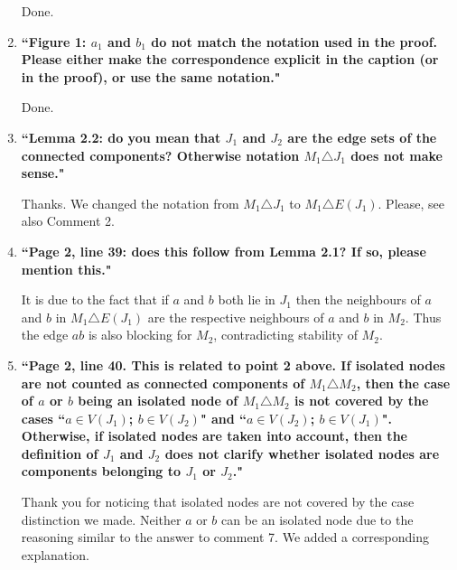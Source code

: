 \documentclass[11pt]{article}
\begin{document}
\begin{enumerate}
		
	\smallskip
	
	Done.
	
	\bigskip
	
	\item \textbf{``Figure 1: $a_1$ and $b_1$ do not match the notation used in the proof. Please either make
the correspondence explicit in the caption (or in the proof), or use the same notation."}
	
	\smallskip
	
	Done.
	
	\bigskip
	
	\item \textbf{``Lemma 2.2: do you mean that $J_1$ and $J_2$ are the edge sets of the connected components? Otherwise notation $M_1\triangle J_1$ does not make sense."}
	
	\smallskip
	
	Thanks. We changed the notation from $M_1\triangle J_1$ to $M_1\triangle E(J_1)$. Please, see also Comment 2.
	
	\bigskip
	
	\item \textbf{``Page 2, line 39: does this follow from Lemma 2.1? If so, please mention this."}
	
	\smallskip
	
	It is due to the fact that if $a$ and $b$ both lie in $J_1$ then the neighbours of $a$ and $b$ in $M_1\triangle E(J_1)$ are the respective neighbours of $a$ and $b$ in $M_2$. Thus the edge $ab$ is also blocking for $M_2$, contradicting stability of $M_2$.
	
	\bigskip
	
		
	\item \textbf{``Page 2, line 40. This is related to point 2 above. If isolated nodes are not counted as
connected components of $M_1\triangle M_2$, then the case of $a$ or $b$ being an isolated node of
$M_1\triangle M_2$ is not covered by the cases ``$a \in V (J_1)$; $b \in V (J_2)$" and ``$a \in V (J_2)$; $b \in V (J_1)$". Otherwise, if isolated nodes are taken into account, then the definition of $J_1$ and $J_2$ does
not clarify whether isolated nodes are components belonging to $J_1$ or $J_2$."}
	
	\smallskip
	
	Thank you for noticing that isolated nodes are not covered by the case distinction we made. Neither $a$ or $b$ can be an isolated node due to the reasoning similar to the answer to comment 7. We added a corresponding explanation.
	

\end{enumerate}
\end{document}
